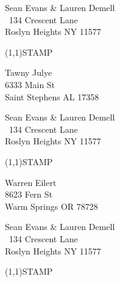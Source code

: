 \documentclass[12pt]{article}
\begin{document}
\begin{minipage}{.5\linewidth} \noindent
Sean Evans \& Lauren Demell\\\ 
134 Crescent Lane\\ 
Roslyn Heights NY 11577
\end{minipage}
\begin{minipage}{.5\linewidth \hspace{-.2in} \vspace{-.3in}}
\begin{flushright}
\framebox(1,1){STAMP}
\end{flushright}
\end{minipage}

\begin{center} \begin{Huge} \vspace*{\fill}
Tawny Julye\\
6333 Main St\\
Saint Stephens AL 17358\\
\vspace{\fill} \end{Huge} \end{center}

\clearpage

\begin{minipage}{.5\linewidth} \noindent
Sean Evans \& Lauren Demell\\\ 
134 Crescent Lane\\ 
Roslyn Heights NY 11577
\end{minipage}
\begin{minipage}{.5\linewidth \hspace{-.2in} \vspace{-.3in}}
\begin{flushright}
\framebox(1,1){STAMP}
\end{flushright}
\end{minipage}

\begin{center} \begin{Huge} \vspace*{\fill}
Warren Eilert\\
8623 Fern St\\
Warm Springs OR 78728\\
\vspace{\fill} \end{Huge} \end{center}

\clearpage

\begin{minipage}{.5\linewidth} \noindent
Sean Evans \& Lauren Demell\\\ 
134 Crescent Lane\\ 
Roslyn Heights NY 11577
\end{minipage}
\begin{minipage}{.5\linewidth \hspace{-.2in} \vspace{-.3in}}
\begin{flushright}
\framebox(1,1){STAMP}
\end{flushright}
\end{minipage}
\end{document}
